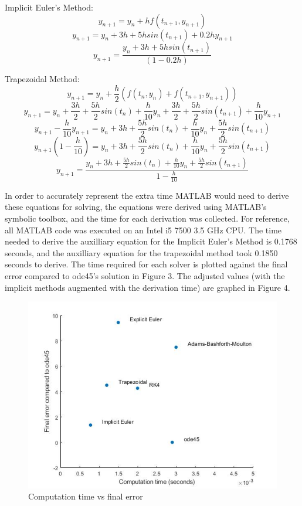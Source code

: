 \documentclass[11pt]{article}
\begin{document}
Implicit Euler's Method:
$$y_{n+1}=y_{n}+hf(t_{n+1}, y_{n+1})$$
$$y_{n+1}=y_{n}+3h+5hsin(t_{n+1})+0.2hy_{n+1}$$
$$y_{n+1}=\frac{y_{n}+3h+5hsin(t_{n+1})}{(1-0.2h)}$$

Trapezoidal Method:
$$y_{n+1}=y_{n}+\frac{h}{2}(f(t_{n},y_{n})+f(t_{n+1},y_{n+1}))$$
$$y_{n+1}=y_{n}+\frac{3h}{2}+\frac{5h}{2}sin(t_{n})+\frac{h}{10}y_{n}+\frac{3h}{2}+\frac{5h}{2}sin(t_{n+1})+\frac{h}{10}y_{n+1}$$
$$y_{n+1}-\frac{h}{10}y_{n+1}=y_{n}+3h+\frac{5h}{2}sin(t_{n})+\frac{h}{10}y_{n}+\frac{5h}{2}sin(t_{n+1})$$
$$y_{n+1}(1-\frac{h}{10})=y_{n}+3h+\frac{5h}{2}sin(t_{n})+\frac{h}{10}y_{n}+\frac{5h}{2}sin(t_{n+1})$$
$$
y_{n+1}=\frac{y_{n}+3h+\frac{5h}{2}sin(t_{n})+\frac{h}{10}y_{n}+\frac{5h}{2}sin(t_{n+1})}{1-\frac{h}{10}}$$

In order to accurately represent the extra time MATLAB would need to derive these
equations for solving, the equations were derived using MATLAB's symbolic
toolbox, and the time for each derivation was collected. For reference, all MATLAB
code was executed on an Intel i5 7500 3.5 GHz CPU. The time needed to derive
the auxilliary equation for the Implicit Euler's Method is  0.1768 seconds,
and the auxilliary equation for the trapezoidal method took 0.1850 seconds to derive.
The time required for each solver is plotted against the final error compared to 
ode45's solution in Figure 3. The adjusted values (with the implicit methods 
augmented with the derivation time) are graphed in Figure 4.

\begin{figure} [h]
\centering
        \includegraphics[totalheight=10cm]{scatter1.jpg}
    \caption{Computation time vs final error}
    \label{fig:verticalcell}
\end{figure}
\end{document}
